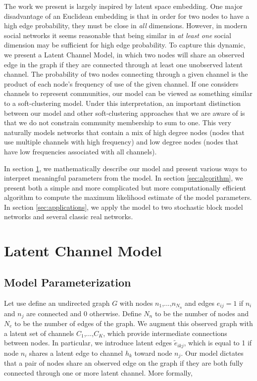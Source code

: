 \documentclass[11pt]{amsart}
\newcommand{\edge}{e}
\newcommand{\latentedge}{\tilde e}
\begin{document}
The work we present is largely inspired by latent space embedding. 
One major disadvantage of an Euclidean embedding is that in order for 
two nodes to have a high edge probability, they must be close in \emph{all}
dimensions. However, in modern social networks it seems reasonable 
that being similar in \emph{at least one} social dimension may be sufficient for high edge probability. 
To capture this dynamic, we present a Latent Channel Model, in which 
two nodes will share an observed edge in the graph if they are connected through 
at least one unobserved latent channel.
The probability of two nodes connecting through a given channel 
is the product of each node's frequency of use of the given channel. 
If one considers channels to represent communities, our model can be viewed 
as something similar to a soft-clustering model. 
Under this interpretation, an important distinction between our model and 
other soft-clustering approaches that we are aware of is that we do not constrain 
community membership to sum to one. 
This very naturally models networks
that contain a mix of high degree nodes (nodes that use multiple channels with high frequency)
and low degree nodes (nodes that have low frequencies associated with all channels). 

In section \ref{sec:model}, we mathematically describe our model and present various ways
to interpret meaningful parameters from the model. In section \ref{sec:algorithm}, we present 
both a simple and more complicated but more computationally efficient algorithm to compute the maximum 
likelihood estimate of the model parameters. In section \ref{sec:applications}, we apply the model 
to two stochastic block model networks and several classic real networks. 

\section{Latent Channel Model}
\label{sec:model}
\subsection{Model Parameterization}

Let use define an undirected graph $G$ with nodes $n_1$,...,$n_{N_n}$ and edges $\edge_{ij} = 1$ if $n_i$ and $n_j$ are connected and 0 otherwise. 
Define $N_n$ to be the number of nodes and $N_e$ to be the number of edges of the graph.
We augment this observed graph with a latent set of channels $C_1$,...,$C_K$, which provide intermediate connections between nodes. 
In particular, we introduce latent edges $\latentedge_{ikj}$, which is equal to 1 if node $n_i$ shares a latent edge to channel $h_k$ toward node $n_j$.
Our model dictates that a pair of nodes share an observed edge on the graph if they are both fully connected through one or more latent channel. More formally, 
\end{document}
